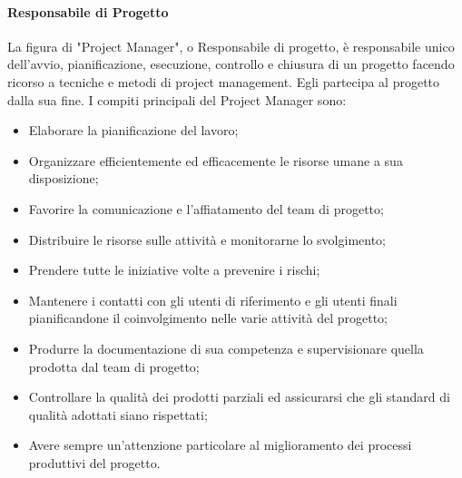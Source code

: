                 \paragraph{Responsabile di Progetto}
                    La figura di "Project Manager", o Responsabile di progetto, è responsabile unico dell'avvio, pianificazione, esecuzione, controllo e chiusura di un progetto facendo ricorso a tecniche e metodi  di project management. Egli partecipa al progetto dalla sua  fine.
                    \newline
                    I compiti principali del Project Manager sono:
                    \begin{itemize}
                        \item Elaborare la pianificazione del lavoro;
                        \item Organizzare efficientemente ed efficacemente le risorse umane a sua disposizione;
                        \item Favorire la comunicazione e l'affiatamento del team di progetto;
                        \item Distribuire le risorse sulle attività e monitorarne lo svolgimento;
                        \item Prendere tutte le iniziative volte a prevenire i rischi;
                        \item Mantenere i contatti con gli utenti di riferimento e gli utenti finali pianificandone il coinvolgimento nelle varie attività del progetto;
                        \item Produrre la documentazione di sua competenza e supervisionare quella prodotta dal team di progetto;
                        \item Controllare la qualità dei prodotti parziali ed assicurarsi che gli standard di qualità adottati siano rispettati;
                        \item Avere sempre un'attenzione particolare al miglioramento dei processi produttivi del progetto.
                    \end{itemize}
